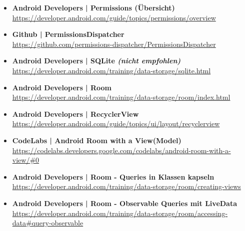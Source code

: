 \documentclass[a4paper]{article}
\begin{document}
		\begin{itemize}
			\item \textbf{Android Developers | Permissions (Übersicht)}\\
			\href{https://developer.android.com/guide/topics/permissions/overview}
			{https://developer.android.com/guide/topics/permissions/overview}
			
			\item \textbf{Github | PermissionsDispatcher}\\
			\href{https://github.com/permissions-dispatcher/PermissionsDispatcher}
			{https://github.com/permissions-dispatcher/PermissionsDispatcher}
			
			\item \textbf{Android Developers | SQLite \textit{(nicht empfohlen)}}\\
			\href{https://developer.android.com/training/data-storage/sqlite.html}
			{https://developer.android.com/training/data-storage/sqlite.html}
			
			\item \textbf{Android Developers | Room}\\
			\href{https://developer.android.com/training/data-storage/room/index.html}
			{https://developer.android.com/training/data-storage/room/index.html}
			
			\item \textbf{Android Developers | RecyclerView}\\
			\href{https://developer.android.com/guide/topics/ui/layout/recyclerview}
			{https://developer.android.com/guide/topics/ui/layout/recyclerview}
			
			\item \textbf{CodeLabs | Android Room with a View(Model)}\\
			\href{https://codelabs.developers.google.com/codelabs/android-room-with-a-view/#0}
			{https://codelabs.developers.google.com/codelabs/android-room-with-a-view/\#0}
			
			\item \textbf{Android Developers | Room - Queries in Klassen kapseln}\\
			\href{https://developer.android.com/training/data-storage/room/creating-views}
			{https://developer.android.com/training/data-storage/room/creating-views}
			
			\item \textbf{Android Developers | Room - Observable Queries mit LiveData}\\
			\href{https://developer.android.com/training/data-storage/room/accessing-data#query-observable}
			{https://developer.android.com/training/data-storage/room/accessing-data\#query-observable}
			

\end{itemize}
\end{document}
